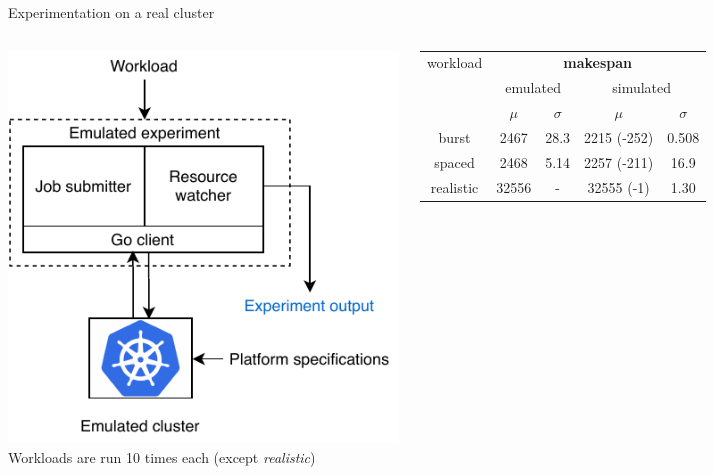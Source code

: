 \documentclass[12pt, aspectratio=43]{beamer}
\begin{document}
\begin{frame}{Experimentation on a real cluster}
	\begin{columns}
		\centering
		\includegraphics[width=\textwidth]{../imgs/expe-protocole-v2-simple.pdf}
		{\small Workloads are run 10 times each (except \textit{realistic})}
		\begin{adjustbox}{max width=\textwidth}
			\begin{tabular}{|c|c|c|c|c|}
				\hline

				\multirow{3}{*}{workload} & \multicolumn{4}{c|}{\textbf{makespan}}\\

				\cline{2-5}

				& \multicolumn{2}{c|}{emulated} &
				\multicolumn{2}{c|}{simulated} \\

				\cline{2-5}

				& $\mu$ & $\sigma$ & $\mu$ & $\sigma$ \\

				\hline

				burst & 2467 & 28.3 & 2215 (-252) & 0.508 \\
				spaced & 2468 & 5.14 & 2257 (-211) & 16.9 \\
				realistic & 32556 & - & 32555 (-1) & 1.30 \\
				\hline
			\end{tabular}
		\end{adjustbox}


\end{columns}
\end{frame}
\end{document}
